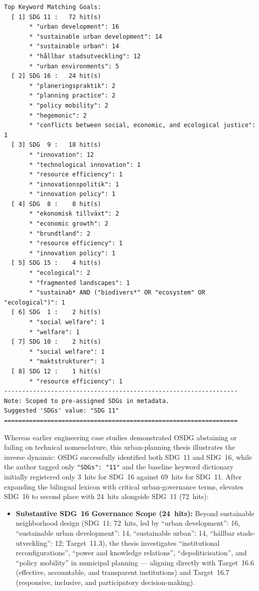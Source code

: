 \begin{casestudySection}
\begin{lstlisting}
Top Keyword Matching Goals:
  [ 1] SDG 11 :   72 hit(s)
       * "urban development": 16
       * "sustainable urban development": 14
       * "sustainable urban": 14
       * "hållbar stadsutveckling": 12
       * "urban environments": 5
  [ 2] SDG 16 :   24 hit(s)
       * "planeringspraktik": 2
       * "planning practice": 2
       * "policy mobility": 2
       * "hegemonic": 2
       * "conflicts between social, economic, and ecological justice": 1
  [ 3] SDG  9 :   18 hit(s)
       * "innovation": 12
       * "technological innovation": 1
       * "resource efficiency": 1
       * "innovationspolitik": 1
       * "innovation policy": 1
  [ 4] SDG  8 :    8 hit(s)
       * "ekonomisk tillväxt": 2
       * "economic growth": 2
       * "brundtland": 2
       * "resource efficiency": 1
       * "innovation policy": 1
  [ 5] SDG 15 :    4 hit(s)
       * "ecological": 2
       * "fragmented landscapes": 1
       * "sustainab* AND ("biodivers*" OR "ecosystem" OR "ecological")": 1
  [ 6] SDG  1 :    2 hit(s)
       * "social welfare": 1
       * "welfare": 1
  [ 7] SDG 10 :    2 hit(s)
       * "social welfare": 1
       * "maktstrukturer": 1
  [ 8] SDG 12 :    1 hit(s)
       * "resource efficiency": 1
-----------------------------------------------------------------
Note: Scoped to pre-assigned SDGs in metadata.
Suggested 'SDGs' value: "SDG 11"
=================================================================
\end{lstlisting}

Whereas earlier engineering case studies demonstrated OSDG abstaining or failing on technical nomenclature, this urban-planning thesis illustrates the inverse dynamic: OSDG successfully identified both \gls{SDG}~11 and \gls{SDG}~16, while the author tagged only \texttt{"SDGs": "11"} and the baseline keyword dictionary initially registered only \num{3}~hits for \gls{SDG}~16 against \num{69}~hits for \gls{SDG}~11. After expanding the bilingual lexicon with critical urban-governance terms,  elevates \gls{SDG}~16 to second place with \num{24}~hits alongside \gls{SDG}~11 (\num{72}~hits):
\begin{itemize}
    \item \textbf{Substantive \gls{SDG}~16 Governance Scope (\num{24}~hits):} Beyond sustainable neighborhood design (\gls{SDG}~11: \num{72}~hits, led by \enquote{urban development}: 16, \enquote{sustainable urban development}: 14, \enquote{sustainable urban}: 14, \enquote{\foreignlanguage{swedish}{hållbar stadsutveckling}}: 12; Target~11.3), the thesis investigates \enquote{institutional reconfigurations}, \enquote{power and knowledge relations}, \enquote{depoliticisation}, and \enquote{policy mobility} in municipal planning --- aligning directly with Target~16.6 (effective, accountable, and transparent institutions) and Target~16.7 (responsive, inclusive, and participatory decision-making).
    

\end{itemize}
\end{casestudySection}

